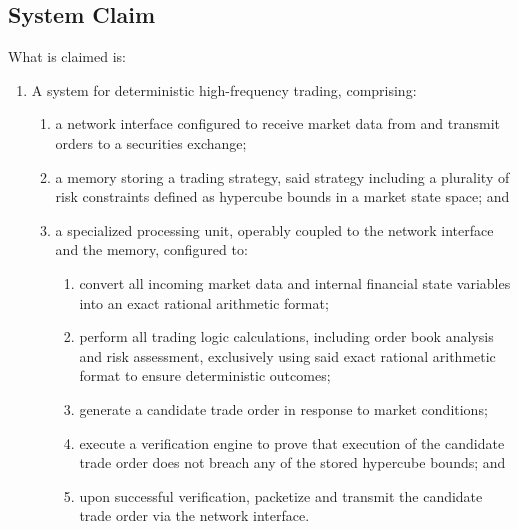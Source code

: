 \documentclass{article}
\begin{document}
\subsection{System Claim}
\noindent What is claimed is:
\begin{enumerate}
    \item A system for deterministic high-frequency trading, comprising:
    \begin{enumerate}
        \item[(a)] a network interface configured to receive market data from and transmit orders to a securities exchange;
        \item[(b)] a memory storing a trading strategy, said strategy including a plurality of risk constraints defined as hypercube bounds in a market state space; and
        \item[(c)] a specialized processing unit, operably coupled to the network interface and the memory, configured to:
        \begin{enumerate}
            \item[(i)] convert all incoming market data and internal financial state variables into an exact rational arithmetic format;
            \item[(ii)] perform all trading logic calculations, including order book analysis and risk assessment, exclusively using said exact rational arithmetic format to ensure deterministic outcomes;
            \item[(iii)] generate a candidate trade order in response to market conditions;
            \item[(iv)] execute a verification engine to prove that execution of the candidate trade order does not breach any of the stored hypercube bounds; and
            \item[ (v)] upon successful verification, packetize and transmit the candidate trade order via the network interface.
        \end{enumerate}
    \end{enumerate}
\end{enumerate}
\end{document}
